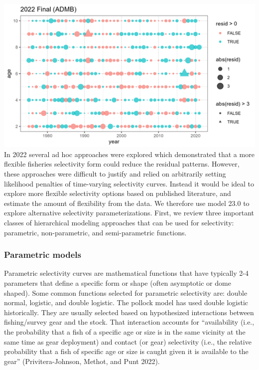 \documentclass[
]{article}
\begin{document}
\includegraphics{Results/Figure2_admb_osa.png} In 2022 several ad hoc
approaches were explored which demonstrated that a more flexible
fisheries selectivity form could reduce the residual patterns. However,
these approaches were difficult to justify and relied on arbitrarily
setting likelihood penalties of time-varying selectivity curves. Instead
it would be ideal to explore more flexible selectivity options based on
published literature, and estimate the amount of flexibility from the
data. We therefore use model 23.0 to explore alternative selectivity
parameterizations. First, we review three important classes of
hierarchical modeling approaches that can be used for selectivity:
parametric, non-parametric, and semi-parametric functions.

\hypertarget{parametric-models}{%
\subsubsection{Parametric models}\label{parametric-models}}

Parametric selectivity curves are mathematical functions that have
typically 2-4 parameters that define a specific form or shape (often
asymptotic or dome shaped). Some common functions selected for
parametric selectivity are: double normal, logistic, and double
logistic. The pollock model has used double logistic historically. They
are usually selected based on hypothesized interactions between
fishing/survey gear and the stock. That interaction accounts for
``availability (i.e., the probability that a fish of a specific age or
size is in the same vicinity at the same time as gear deployment) and
contact (or gear) selectivity (i.e., the relative probability that a
fish of specific age or size is caught given it is available to the
gear'' (Privitera-Johnson, Methot, and Punt 2022).
\end{document}
